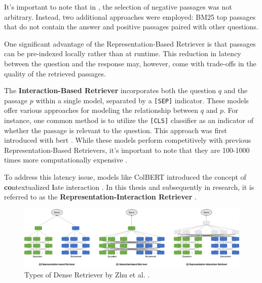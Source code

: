 It's important to note that in \cite{karpukhin_dense_2020}, the selection of negative passages was not arbitrary. Instead, two additional approaches were employed: BM25 top passages that do not contain the answer and positive passages paired with other questions.

One significant advantage of the Representation-Based Retriever is that passages can be pre-indexed locally rather than at runtime. This reduction in latency between the question and the response may, however, come with trade-offs in the quality of the retrieved passages.

The \textbf{Interaction-Based Retriever} incorporates both the question $q$ and the passage $p$ within a single model, separated by a \verb|[SEP]| indicator. These models offer various approaches for modeling the relationship between $q$ and $p$. For instance, one common method is to utilize the \verb|[CLS]| classifier as an indicator of whether the passage is relevant to the question. This approach was first introduced with \gls{bert} \cite{devlin_bert_2019}. While these models perform competitively with previous Representation-Based Retrievers, it's important to note that they are 100-1000 times more computationally expensive \cite{khattab_colbert_2020}.

To address this latency issue, models like ColBERT introduced the concept of \textbf{co}ntextualized \textbf{l}ate interaction \cite{khattab_colbert_2020}. In this thesis and subsequently in research, it is referred to as the \textbf{Representation-Interaction Retriever} \cite{zhu_retrieving_2021}.


\begin{figure}
    \centering
    \includegraphics[width=\textwidth]{Grafiken/Types_of_Retriever.png}
    \caption{Types of Dense Retriever by Zhu et al. \cite{zhu_retrieving_2021}.}
    \label{fig:types_of_retriever}
\end{figure}

